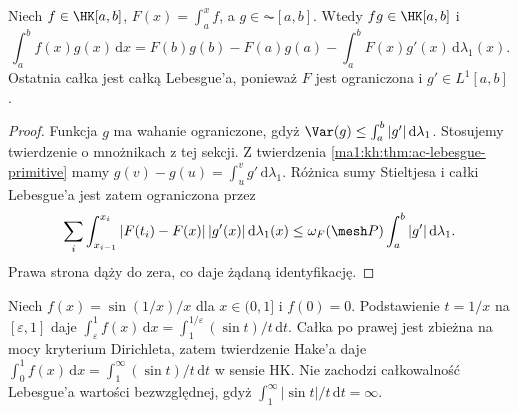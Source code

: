 \begin{wniosek}\label{ma1:kh:wn:hk-ibp-ac}\label{wn:hk-ibp-ac}
Niech $f\in\HK[a,b]$, $F(x)=\int_a^x f$, a $g\in\AC[a,b]$. Wtedy $fg\in\HK[a,b]$ i
\[
\int_a^b f(x)g(x)\,\mathrm dx=F(b)g(b)-F(a)g(a)-\int_a^b F(x)g'(x)\,\mathrm d\lambda_1(x).
\]
Ostatnia całka jest całką Lebesgue'a, ponieważ $F$ jest ograniczona i $g'\in L^1[a,b]$.
\end{wniosek}
\begin{proof}
Funkcja $g$ ma wahanie ograniczone, gdyż $\Var(g)\le\int_a^b|g'|\,\mathrm d\lambda_1$. Stosujemy twierdzenie o mnożnikach z tej sekcji. Z twierdzenia \ref{ma1:kh:thm:ac-lebesgue-primitive} mamy $g(v)-g(u)=\int_u^v g'\,\mathrm d\lambda_1$. Różnica sumy Stieltjesa i całki Lebesgue'a jest zatem ograniczona przez
\[
 \sum_i\int_{x_{i-1}}^{x_i}|F(t_i)-F(x)|\,|g'(x)|\,\mathrm d\lambda_1(x)
 \le \omega_F(\mesh P)\int_a^b|g'|\,\mathrm d\lambda_1.
\]
Prawa strona dąży do zera, co daje żądaną identyfikację.
\end{proof}
\begin{przyklad}
Niech $f(x)=\sin(1/x)/x$ dla $x\in(0,1]$ i $f(0)=0$. Podstawienie $t=1/x$ na $[\varepsilon,1]$ daje
$\int_\varepsilon^1f(x)\,\mathrm dx=\int_1^{1/\varepsilon}(\sin t)/t\,\mathrm dt$.
Całka po prawej jest zbieżna na mocy kryterium Dirichleta, zatem twierdzenie Hake'a daje
$\int_0^1f(x)\,\mathrm dx=\int_1^\infty (\sin t)/t\,\mathrm dt$ w sensie HK. Nie zachodzi całkowalność Lebesgue'a wartości bezwzględnej, gdyż $\int_1^\infty|\sin t|/t\,\mathrm dt=\infty$.
\end{przyklad}
